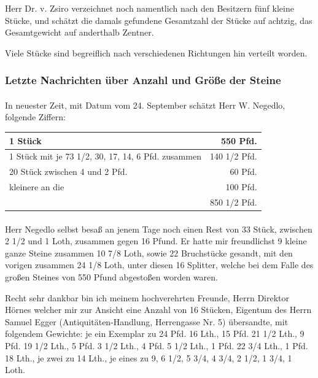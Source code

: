 \documentclass[a4paper, 11pt, oneside, german]{article}
\begin{document}
Herr Dr. v. Zsiro verzeichnet noch namentlich nach den Besitzern fünf kleine Stücke, und schätzt die damals gefundene Gesamtzahl der Stücke auf achtzig, das Gesamtgewicht auf anderthalb Zentner.

Viele Stücke sind begreiflich nach verschiedenen Richtungen hin verteilt worden.
\clearpage
\subsubsection{Letzte Nachrichten über Anzahl und Größe der Steine}
\paragraph{}
In neuester Zeit, mit Datum vom 24. September schätzt Herr W. Negedlo, folgende Ziffern:
\begin{table}[H]
    \centering\small
    \begin{tabular}{|l|r|}
    \hline
        1 Stück & 550 Pfd. \\ \hline
        1 Stück mit je 73 1/2, 30, 17, 14, 6 Pfd. zusammen & 140 1/2 Pfd. \\ \hline
        20 Stück zwischen 4 und 2 Pfd. & 60 Pfd. \\ \hline
        kleinere an die & 100 Pfd. \\ \hline
        ~ & 850 1/2 Pfd. \\ \hline
    \end{tabular}
\end{table}
\paragraph{}
Herr Negedlo selbst besaß an jenem Tage noch einen Rest von 33 Stück, zwischen 2 1/2 und 1 Loth, zusammen gegen 16 Pfund. Er hatte mir freundlichst 9 kleine ganze Steine zusammen 10 7/8 Loth, sowie 22 Bruchstücke gesandt, mit den vorigen zusammen 24 1/8 Loth, unter diesen 16 Splitter, welche bei dem Falle des großen Steines von 550 Pfund abgestoßen worden waren.

Recht sehr dankbar bin ich meinem hochverehrten Freunde, Herrn Direktor Hörnes welcher mir zur Ansicht eine Anzahl von 16 Stücken, Eigentum des Herrn Samuel Egger (Antiquitäten-Handlung, Herrengasse Nr. 5) übersandte, mit folgendem Gewichte: je ein Exemplar zu 24 Pfd. 16 Lth., 15 Pfd. 21 1/2 Lth., 9 Pfd. 19 1/2 Lth., 5 Pfd. 3 1/2 Lth., 4 Pfd. 5 1/2 Lth., 1 Pfd. 22 3/4 Lth., 1 Pfd. 18 Lth., je zwei zu 14 Lth., je eines zu 9, 6 1/2, 5 3/4, 4 3/4, 2 1/2, 1 3/4, 1 Loth.
\end{document}
